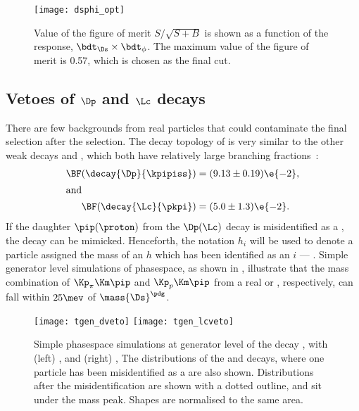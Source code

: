 \begin{figure}
  \begin{center}
    \texttt{[image: dsphi\_opt]}
    \caption[Optimisation of BDT cut for selection of \btodsphi candidates]
    {
      Value of the figure of merit $S/\sqrt{S+B}$ is shown as a function of the \bdt response,
      $\bdt_{\Ds}\times\bdt_{\phi}$.
      The maximum value of the figure of merit is 0.57, which is chosen as the final \bdt cut.
    }
    \label{fig:dsphi:opt}
  \end{center}
\end{figure}



\subsection[Vetoes of {\Dp} and {\Lc} deacys]
{Vetoes of $\boldsymbol{\Dp}$ and $\boldsymbol{\Lc}$ decays}
\label{sec:dsphi:sel:veto}
There are few backgrounds from real particles that could contaminate the final selection after the
\bdt selection.
The decay topology of \dstokkpi is very similar to the other weak decays \decay{\Dp}{\kpipiss} and
\decay{\Lc}{\pkpi}, which both
have relatively large branching fractions~\cite{PDG2012}:
\begin{align}
  \BF(\decay{\Dp}{\kpipiss}) &= (9.13\pm0.19)\e{-2}, \nonumber\\
  \intertext{and}
  \BF(\decay{\Lc}{\pkpi}) &= (5.0\pm1.3)\e{-2}.\nonumber
\end{align}
If the daughter $\pip(\proton)$ from the $\Dp(\Lc)$ decay is misidentified as a \Kp, the decay
\dstokkpi can be mimicked.
Henceforth, the notation $h_i$ will be used to denote a particle assigned the mass of an $h$ which
has been identified as an $i$ --- .
Simple generator level simulations of phasespace, as shown in , illustrate that
the mass combination of $\Kp_\pi\Km\pip$ and $\Kp_p\Km\pip$ from a real \Dp or \Lc, respectively,
can fall within $25\mev$ of $\mass{\Ds}^\pdg$.


\begin{figure}
  \begin{center}
    \texttt{[image: tgen\_dveto]}
    \texttt{[image: tgen\_lcveto]}
    \caption[Vetoing \Ds contamination from \Lc and \Dp decays]
    {
      Simple phasespace simulations at generator level of the decay \decay{\Ds}{\kkpi}, with
      (left) \decay{\Dp}{\kpipiss}, and
      (right) \decay{\Lc}{\pkpi},
      The distributions of the \Dp and \Lc decays, where one particle has been misidentified as a
      \Kp are also shown.
      Distributions after the misidentification are shown with a dotted outline, and sit under the
      \Ds mass peak.
      Shapes are normalised to the same area.
    }
    \label{fig:dsphi:veto}
  \end{center}
\end{figure}

